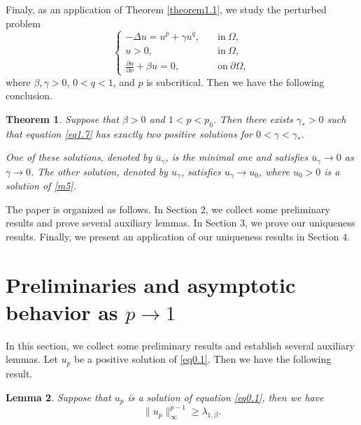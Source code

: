 \documentclass[12pt,reqno]{amsart}
\numberwithin{equation}{section}
\newtheorem{theorem}{Theorem}[section]
\newtheorem{lemma}[theorem]{Lemma}
\theoremstyle{definition}
\begin{document}
Finaly, as an application of Theorem \ref{theorem1.1}, we study the perturbed problem 
\begin{equation}\label{eq1.7}
\begin{cases}
-\Delta u=u^p+\gamma u^q,\quad &\text{in}\ \Omega,\\
u>0,  \quad &\text{in}\ \Omega,\\
\frac{\partial u}{\partial \nu}+\beta u=0, &\text{on}\ \partial\Omega,
\end{cases}
\end{equation}
where $\beta,\gamma>0$, $0<q<1$, and $p$ is subcritical. Then we have the following conclusion.

\begin{theorem}\label{theorem1.4}
Suppose that $\beta>0$ and $1<p<p_0$. Then there exists $\gamma_*>0$ such that 
equation \eqref{eq1.7} has exactly two positive solutions for $0<\gamma<\gamma_*$.

One of these solutions, denoted by $\bar u_\gamma$, is the minimal one and satisfies $\bar u_\gamma\to0$ as $\gamma\to0$. The other solution, denoted by $u_\gamma$, satisfies $u_\gamma\to u_0$, where $u_0>0$ is a solution of \eqref{m5}.
\end{theorem}


The paper is organized as follows. In Section 2, we collect some preliminary results and prove several auxiliary lemmas. In Section 3, we prove our uniqueness results. Finally, we present an application of our uniqueness results in Section 4. 




\section{Preliminaries and asymptotic behavior as $p \to 1$}


In this section, we collect some preliminary results and establish several auxiliary lemmas. Let $u_p$ be a positive solution of \eqref{eq0.1}. Then we have the following result. 

\begin{lemma}\label{lemma2.1}
Suppose that $u_p$ is a solution of equation \eqref{eq0.1}, then we have 
$$
\|u_p\|_\infty^{p-1}\ge \lambda_{1,\beta}.
$$
\end{lemma}
\end{document}
